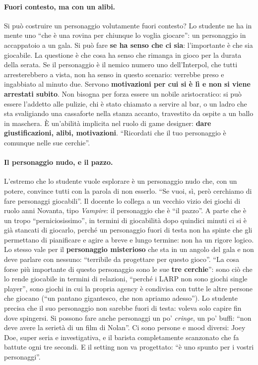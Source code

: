 \paragraph{Fuori contesto, ma con un alibi.} Si può costruire un personaggio
volutamente fuori contesto? Lo studente ne ha in mente uno ``che è una rovina per
chiunque lo voglia giocare'': un personaggio in accappatoio a un gala. Si può fare
\textbf{se ha senso che ci sia}: l'importante è che sia giocabile. La questione è che
cosa ha senso che rimanga in gioco per la durata della serata. Se il personaggio è
il nemico numero uno dell'Interpol, che tutti arresterebbero a vista, non ha senso
in questo scenario: verrebbe preso e ingabbiato al minuto due. Servono
\textbf{motivazioni per cui si è lì e non si viene arrestati subito}. Non bisogna
per forza essere un nobile aristocratico: si può essere l'addetto alle pulizie,
chi è stato chiamato a servire al bar, o un ladro che sta svaligiando una cassaforte
nella stanza accanto, travestito da ospite a un ballo in maschera. È un'abilità
implicita nel ruolo di game designer: \textbf{dare giustificazioni, alibi,
motivazioni}. ``Ricordati che il tuo personaggio è comunque nelle sue cerchie''.

\paragraph{Il personaggio nudo, e il pazzo.} L'estremo che lo studente vuole esplorare
è un personaggio nudo che, con un potere, convince tutti con la parola di non
esserlo. ``Se vuoi, sì, però cerchiamo di fare personaggi giocabili''. Il docente
lo collega a un vecchio vizio dei giochi di ruolo anni Novanta, tipo
\emph{Vampire}: il personaggio che è ``il pazzo''. A parte che è un tropo
``perniciosissimo'', in termini di giocabilità dopo quindici minuti ci si è già
stancati di giocarlo, perché un personaggio fuori di testa non ha spinte che gli
permettano di pianificare e agire a breve e lungo termine: non ha un rigore logico.
Lo stesso vale per il \textbf{personaggio misterioso} che sta in un angolo del gala e
non deve parlare con nessuno: ``terribile da progettare per questo gioco''. ``La cosa
forse più importante di questo personaggio sono le sue \textbf{tre cerchie}'': sono
ciò che lo rende giocabile in termini di relazioni, ``perché i LARP non sono giochi
single player'', sono giochi in cui la propria agency è condivisa con tutte le altre
persone che giocano (``un pantano gigantesco, che non apriamo adesso''). Lo studente
precisa che il suo personaggio non sarebbe fuori di testa: voleva solo capire fin
dove spingersi. Si possono fare anche personaggi un po' \emph{cringe}, un po' buffi:
``non deve avere la serietà di un film di Nolan''. Ci sono persone e mood diversi:
Joey Doe, super seria e investigativa, e il barista completamente scanzonato che fa
battute ogni tre secondi. E il setting non va progettato: ``è uno spunto per i vostri
personaggi''.

